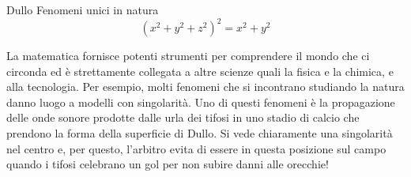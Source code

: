 \begin{surferPage}{Dullo}
Fenomeni unici in natura\\
\smallskip
\[(x^2+ y^2+ z^2)^2	= x^2+ y^2\]

\singlespacing
La matematica fornisce potenti strumenti per comprendere il mondo che ci circonda ed \`e strettamente collegata a altre scienze quali la fisica e la chimica, e alla tecnologia.
\singlespacing
Per esempio, molti fenomeni che si incontrano studiando la natura danno luogo a modelli con singolarit\`a.
\singlespacing
Uno di questi fenomeni \`e la propagazione delle onde sonore prodotte dalle urla dei tifosi in uno stadio di calcio che prendono la forma della superficie di Dullo. Si vede chiaramente una singolarit\`a nel centro e, per questo, l'arbitro evita di essere in questa posizione sul campo quando i tifosi celebrano un gol per non subire danni alle orecchie!
\end{surferPage}
